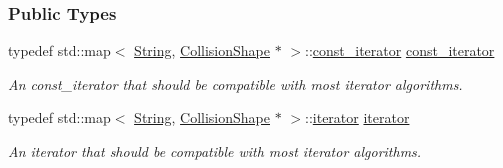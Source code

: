 \subsubsection*{Public Types}
\begin{DoxyCompactItemize}
\item 
\hypertarget{classMezzanine_1_1CollisionShapeManager_a44318f2b04d35ecc76d5c58ea574f0f0}{
typedef std::map$<$ \hyperlink{namespaceMezzanine_acf9fcc130e6ebf08e3d8491aebcf1c86}{String}, \hyperlink{classMezzanine_1_1CollisionShape}{CollisionShape} $\ast$ $>$::\hyperlink{classMezzanine_1_1CollisionShapeManager_a44318f2b04d35ecc76d5c58ea574f0f0}{const\_\-iterator} \hyperlink{classMezzanine_1_1CollisionShapeManager_a44318f2b04d35ecc76d5c58ea574f0f0}{const\_\-iterator}}
\label{classMezzanine_1_1CollisionShapeManager_a44318f2b04d35ecc76d5c58ea574f0f0}

\begin{DoxyCompactList}\small\item\em An const\_\-iterator that should be compatible with most iterator algorithms. \item\end{DoxyCompactList}\item 
\hypertarget{classMezzanine_1_1CollisionShapeManager_abec03ca004aae3ce0dc478e34e5d1252}{
typedef std::map$<$ \hyperlink{namespaceMezzanine_acf9fcc130e6ebf08e3d8491aebcf1c86}{String}, \hyperlink{classMezzanine_1_1CollisionShape}{CollisionShape} $\ast$ $>$::\hyperlink{classMezzanine_1_1CollisionShapeManager_abec03ca004aae3ce0dc478e34e5d1252}{iterator} \hyperlink{classMezzanine_1_1CollisionShapeManager_abec03ca004aae3ce0dc478e34e5d1252}{iterator}}
\label{classMezzanine_1_1CollisionShapeManager_abec03ca004aae3ce0dc478e34e5d1252}

\begin{DoxyCompactList}\small\item\em An iterator that should be compatible with most iterator algorithms. \item\end{DoxyCompactList}\end{DoxyCompactItemize}

